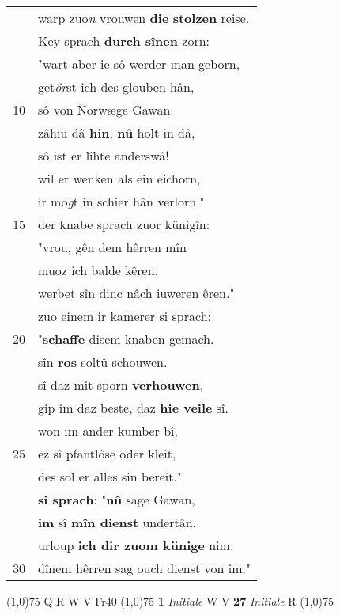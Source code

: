 \documentclass[8pt,a4paper,notitlepage]{article}
\begin{document}
\begin{table}[ht]
\begin{minipage}[t]{0.5\linewidth}
\begin{tabular}{rl}
 & warp zuo\textit{n} vrouwen \textbf{die} \textbf{stolzen} reise.\\ 
 & Key sprach \textbf{durch sînen} zorn:\\ 
 & "wart aber ie sô werder man geborn,\\ 
 & get\textit{ör}st ich des glouben hân,\\ 
10 & sô von Norwæge Gawan.\\ 
 & zâhiu dâ \textbf{hin}, \textbf{nû} holt in dâ,\\ 
 & sô ist er lîhte anderswâ!\\ 
 & wil er wenken als ein eichorn,\\ 
 & ir mo\textit{g}t in schier hân verlorn."\\ 
15 & der knabe sprach zuor künigîn:\\ 
 & "vrou, gên dem hêrren mîn\\ 
 & muoz ich balde kêren.\\ 
 & werbet sîn dinc nâch iuweren êren."\\ 
 & zuo einem ir kamerer si sprach:\\ 
20 & "\textbf{schaffe} disem knaben gemach.\\ 
 & sîn \textbf{ros} soltû schouwen.\\ 
 & sî daz mit sporn \textbf{verhouwen},\\ 
 & gip im daz beste, daz \textbf{hie veile} sî.\\ 
 & won im ander kumber bî,\\ 
25 & ez sî pfantlôse oder kleit,\\ 
 & des sol er alles sîn bereit."\\ 
 & \textbf{si sprach}: "\textbf{nû} sage Gawan,\\ 
 & \textbf{im} sî \textbf{mîn dienst} undertân.\\ 
 & urloup \textbf{ich dir zuom künige} nim.\\ 
30 & dînem hêrren sag ouch dienst von im."\\ 
\end{tabular}
\scriptsize
\line(1,0){75} \newline
Q R W V Fr40 \newline
\line(1,0){75} \newline
\textbf{1} \textit{Initiale} W V  \textbf{27} \textit{Initiale} R  \newline
\line(1,0){75} \newline

\end{minipage}
\end{table}
\end{document}
